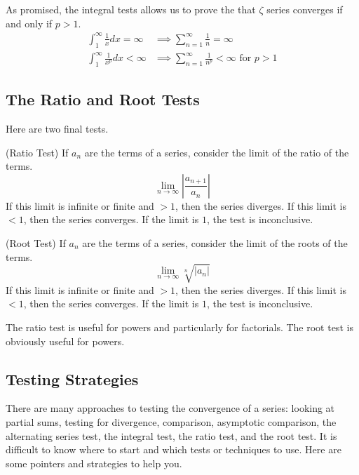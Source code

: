 \documentclass[fleqn,letterpaper]{report}
\begin{document}
\begin{example} As promised, the integral tests allows us to
prove the that $\zeta$ series converges if and only if $p>1$.
\begin{align*}
\int_1^\infty \frac{1}{x} dx = \infty & \implies
\sum_{n=1}^\infty \frac{1}{n} = \infty \\
\int_1^\infty \frac{1}{x^p} dx < \infty & \implies
\sum_{n=1}^\infty \frac{1}{n^p} < \infty \text{ for } p > 1
\end{align*}
\end{example}

\subsection{The Ratio and Root Tests}
\label{ratio-root}

Here are two final tests.

\begin{prop}
(Ratio Test) If $a_n$ are the terms of a series, consider the 
limit of the ratio of the terms.
\begin{equation*}
\lim_{n \rightarrow \infty} \left| \frac{a_{n+1}}{a_n} \right|
\end{equation*}
If this limit is infinite or finite and $>1$, then the
series diverges. If this limit is $<1$, then the series
converges. If the limit is $1$, the test is inconclusive.
\end{prop}

\begin{prop}
(Root Test) If $a_n$ are the terms of a series, consider the 
limit of the roots of the terms. 
\begin{equation*}
\lim_{n \rightarrow \infty} \sqrt[n]{|a_n|} 
\end{equation*}
If this limit is infinite or finite and $>1$, then the
series diverges. If this limit is $<1$, then the series
converges. If the limit is $1$, the test is inconclusive.
\end{prop}

The ratio test is useful for powers and particularly for
factorials. The root test is obviously useful for powers.

\subsection{Testing Strategies}
\label{testing-strategies}

There are many approaches to testing the convergence of a
series: looking at partial sums, testing for divergence,
comparison, asymptotic comparison, the alternating series
test, the integral test, the ratio test, and the root test.
It is difficult to know where to start and which tests
or techniques to use. Here are some pointers and strategies
to help you.
\end{document}
